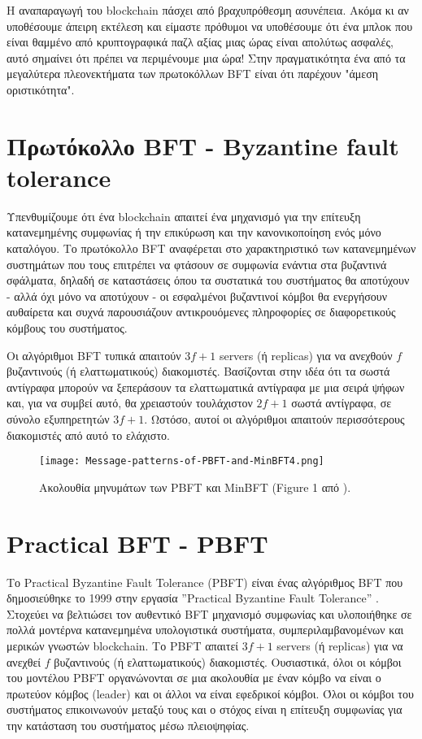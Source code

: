 Η αναπαραγωγή του blockchain πάσχει από βραχυπρόθεσμη ασυνέπεια. Ακόμα κι αν υποθέσουμε άπειρη εκτέλεση και είμαστε πρόθυμοι να υποθέσουμε ότι ένα μπλοκ που είναι θαμμένο από κρυπτογραφικά παζλ αξίας μιας ώρας είναι απολύτως ασφαλές, αυτό σημαίνει ότι πρέπει να περιμένουμε μια ώρα! Στην πραγματικότητα ένα από τα μεγαλύτερα πλεονεκτήματα των πρωτοκόλλων BFT είναι ότι παρέχουν "άμεση οριστικότητα".


\section{Πρωτόκολλο BFT - Byzantine fault tolerance}
Υπενθυμίζουμε ότι ένα blockchain απαιτεί ένα μηχανισμό για την επίτευξη κατανεμημένης συμφωνίας ή την επικύρωση και την κανονικοποίηση ενός μόνο καταλόγου. Το πρωτόκολλο BFT αναφέρεται στο χαρακτηριστικό των κατανεμημένων συστημάτων που τους επιτρέπει να φτάσουν σε συμφωνία ενάντια στα βυζαντινά σφάλματα, δηλαδή σε καταστάσεις όπου τα συστατικά του συστήματος θα αποτύχουν - αλλά όχι μόνο να αποτύχουν - οι εσφαλμένοι βυζαντινοί κόμβοι θα ενεργήσουν αυθαίρετα και συχνά παρουσιάζουν αντικρουόμενες πληροφορίες σε διαφορετικούς κόμβους του συστήματος.

Οι αλγόριθμοι BFT τυπικά απαιτούν $3f + 1$ servers (ή replicas) για να ανεχθούν $f$ βυζαντινούς (ή ελαττωματικούς) διακομιστές. Βασίζονται στην ιδέα ότι τα σωστά αντίγραφα μπορούν να ξεπεράσουν τα ελαττωματικά αντίγραφα με μια σειρά ψήφων και, για να συμβεί αυτό, θα χρειαστούν τουλάχιστον $2f + 1$ σωστά αντίγραφα, σε σύνολο εξυπηρετητών $3f + 1$. Ωστόσο, αυτοί οι αλγόριθμοι απαιτούν περισσότερους διακομιστές από αυτό το ελάχιστο.

\begin{figure}
  \texttt{[image: Message-patterns-of-PBFT-and-MinBFT4.png]}
  \caption{Ακολουθία μηνυμάτων των PBFT και MinBFT (Figure 1 από \cite{minbftpaper}).}
  \label{fig:minbftpatterns1}
\end{figure}


\section{Practical BFT - PBFT} \label{pbftSection}
Το Practical Byzantine Fault Tolerance (PBFT) είναι ένας αλγόριθμος BFT που δημοσιεύθηκε το 1999 στην εργασία ''Practical Byzantine Fault Tolerance'' \cite{pbft}. Στοχεύει να βελτιώσει τον αυθεντικό BFT μηχανισμό συμφωνίας και υλοποιήθηκε σε πολλά μοντέρνα κατανεμημένα υπολογιστικά συστήματα, συμπεριλαμβανομένων και μερικών γνωστών blockchain. Το PBFT απαιτεί $3f + 1$ servers (ή replicas) για να ανεχθεί $f$ βυζαντινούς (ή ελαττωματικούς) διακομιστές. Ουσιαστικά, όλοι οι κόμβοι του μοντέλου PBFT οργανώνονται σε μια ακολουθία με έναν κόμβο να είναι ο πρωτεύον κόμβος (leader) και οι άλλοι να είναι εφεδρικοί κόμβοι. Όλοι οι κόμβοι του συστήματος επικοινωνούν μεταξύ τους και ο στόχος είναι η επίτευξη συμφωνίας για την κατάσταση του συστήματος μέσω πλειοψηφίας.

